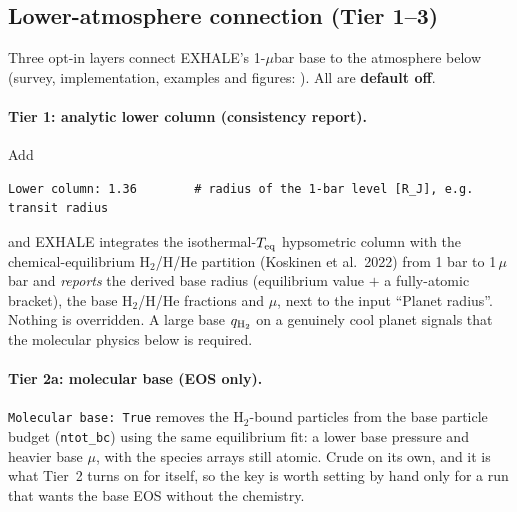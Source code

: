 \documentclass[english,a4paper]{my_memo}
\begin{document}
\subsection{Lower-atmosphere connection (Tier 1--3)}\label{sec:loweratm}
Three opt-in layers connect EXHALE's 1-$\mu$bar base to the atmosphere below
(survey, implementation, examples and figures:
). All are \textbf{default off}.

\paragraph{Tier 1: analytic lower column (consistency report).} Add
\begin{verbatim}
Lower column: 1.36        # radius of the 1-bar level [R_J], e.g. transit radius
\end{verbatim}
and EXHALE integrates the isothermal-$T_{\rm eq}$ hypsometric column with the
chemical-equilibrium H$_2$/H/He partition (Koskinen et al.\ 2022) from 1 bar to
1\,$\mu$bar and \emph{reports} the derived base radius (equilibrium value $+$ a
fully-atomic bracket), the base H$_2$/H/He fractions and $\mu$, next to the input
``Planet radius''. Nothing is overridden. A large base $q_{\rm H_2}$ on a
genuinely cool planet signals that the molecular physics below is required.

\paragraph{Tier 2a: molecular base (EOS only).}
\texttt{Molecular base: True} removes the H$_2$-bound particles from the base
particle budget (\texttt{ntot\_bc}) using the same equilibrium fit: a lower
base pressure and heavier base $\mu$, with the species arrays still atomic.
Crude on its own, and it is what Tier~2 turns on for itself, so the key is
worth setting by hand only for a run that wants the base EOS without the
chemistry.
\end{document}
